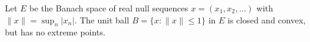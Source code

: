 Let $E$ be the Banach space of real null sequences $x = (x_1, x_2, \ldots)$ with $\|x\| = \sup_n |x_n|$. The unit ball $B = \{ x : \|x\| \leq 1 \}$ in $E$ is closed and convex, but has no extreme points.
